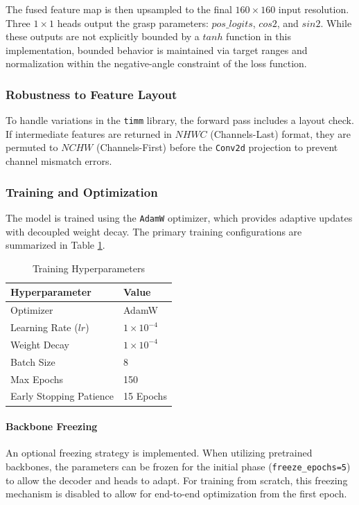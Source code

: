 The fused feature map is then upsampled to the final $160 \times 160$ input resolution. Three $1 \times 1$ heads output the grasp parameters: $pos\_logits$, $cos2$, and $sin2$. While these outputs are not explicitly bounded by a $tanh$ function in this implementation, bounded behavior is maintained via target ranges and normalization within the negative-angle constraint of the loss function.

\subsubsection{Robustness to Feature Layout}
To handle variations in the \texttt{timm} library, the forward pass includes a layout check. If intermediate features are returned in $NHWC$ (Channels-Last) format, they are permuted to $NCHW$ (Channels-First) before the \texttt{Conv2d} projection to prevent channel mismatch errors.

\subsubsection{Training and Optimization}
The model is trained using the \texttt{AdamW} optimizer, which provides adaptive updates with decoupled weight decay. The primary training configurations are summarized in Table \ref{tab:hyperparameters}.

\begin{table}[h]
\centering
\caption{Training Hyperparameters}
\label{tab:hyperparameters}
\begin{tabular}{ll}
\hline
\textbf{Hyperparameter} & \textbf{Value} \\ \hline
Optimizer               & AdamW          \\
Learning Rate ($lr$)    & $1 \times 10^{-4}$ \\
Weight Decay            & $1 \times 10^{-4}$ \\
Batch Size              & 8              \\
Max Epochs              & 150            \\
Early Stopping Patience & 15 Epochs      \\ \hline
\end{tabular}
\end{table}

\paragraph{Backbone Freezing}
An optional freezing strategy is implemented. When utilizing pretrained backbones, the parameters can be frozen for the initial phase (\texttt{freeze\_epochs=5}) to allow the decoder and heads to adapt. For training from scratch, this freezing mechanism is disabled to allow for end-to-end optimization from the first epoch.

